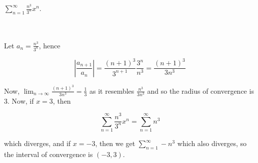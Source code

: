 $\sum_{n=1}^{\infty} \frac{n^3}{3^n}x^n$.\\\\

\begin{solution}\renewcommand{\qedsymbol}{}\ \\
    Let $a_n=\frac{n^3}{3^n}$, hence
    
    $$|\frac{a_{n+1}}{a_n}|=\frac{(n+1)^3}{3^{n+1}}\frac{3^n}{n^3}=\frac{(n+1)^3}{3n^3}$$
    
    Now, $\lim_{n\to\infty} \frac{(n+1)^3}{3n^3}=\frac13$ as it resembles $\frac{n^3}{3n^3}$ and so the
    radius of convergence is 3. Now, if $x=3$, then
    
    $$\sum_{n=1}^{\infty} \frac{n^3}{3^n}x^n=\sum_{n=1}^{\infty} n^3$$
    
    which diverges, and if $x=-3$, then we get $\sum_{n=1}^{\infty} -n^3$ which also diverges, so the
    interval of convergence is $(-3,3)$.

\end{solution}